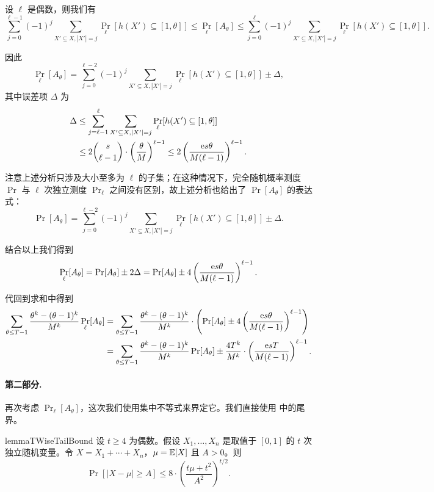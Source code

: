 设 $\ell$ 是偶数，则我们有
$$
\sum_{j = 0}^{\ell - 1} (-1)^j \sum_{X' \subseteq X, |X'| = j} \Pr_\ell[h(X') \subseteq [1, \theta]] \le \Pr_\ell[A_\theta] \le \sum_{j = 0}^\ell (-1)^j \sum_{X' \subseteq X, |X'| = j} \Pr_\ell[h(X') \subseteq [1, \theta]].
$$

因此
$$
\Pr_\ell[A_\theta] = \sum_{j = 0}^{\ell - 2} (-1)^j \sum_{X' \subseteq X, |X'| = j} \Pr_\ell[h(X') \subseteq [1, \theta]] \pm \Delta,
$$
其中误差项 $\Delta$ 为
$$
\begin{aligned}
    \Delta & \le \sum_{j = \ell - 1}^\ell \sum_{X' \subseteq X, |X'| = j} \Pr_\ell[h(X') \subseteq [1, \theta]] \\
     & \le 2 \binom{s}{\ell - 1} \cdot \left( \frac{\theta}{M} \right)^{\ell - 1} \le 2 \left( \frac{\mathrm{e} s \theta}{M (\ell - 1)} \right)^{\ell - 1}.
\end{aligned}
$$

注意上述分析只涉及大小至多为 $\ell$ 的子集；在这种情况下，完全随机概率测度 $\Pr$ 与 $\ell$ 次独立测度 $\Pr_\ell$ 之间没有区别，故上述分析也给出了 $\Pr[A_\theta]$ 的表达式：
$$
\Pr[A_\theta] = \sum_{j = 0}^{\ell - 2} (-1)^j \sum_{X' \subseteq X, |X'| = j} \Pr_\ell[h(X') \subseteq [1, \theta]] \pm \Delta.
$$

结合以上我们得到
$$
\Pr_\ell[A_\theta] = \Pr[A_\theta] \pm 2 \Delta = \Pr[A_\theta] \pm 4 \left( \frac{\mathrm{e} s \theta}{M (\ell - 1)} \right)^{\ell - 1}.
$$

代回到求和中得到
$$
\begin{aligned}
    \sum_{\theta \le T - 1} \frac{\theta^k - (\theta - 1)^k}{M^k} \Pr_\ell[A_\theta] & = \sum_{\theta \le T - 1} \frac{\theta^k - (\theta - 1)^k}{M^k} \cdot \left( \Pr[A_\theta] \pm 4 \left( \frac{\mathrm{e} s \theta}{M (\ell - 1)} \right)^{\ell - 1} \right) \\
     & = \sum_{\theta \le T - 1} \frac{\theta^k - (\theta - 1)^k}{M^k} \Pr[A_\theta] \pm \frac{4 T^k}{M^k} \cdot \left( \frac{\mathrm{e} s T}{M (\ell - 1)} \right)^{\ell - 1}.
\end{aligned}
$$

\paragraph{第二部分.}

再次考虑 $\Pr_\ell[A_\theta]$，这次我们使用集中不等式来界定它。我们直接使用 \cite{Bellare_Rompel_94} 中的尾界。

\begin{restatable}{lemma}{TWiseTailBound}\label{lem:tail_bound_t_wise_BR94}
    设 $t \ge 4$ 为偶数。假设 $X_1, \ldots, X_n$ 是取值于 $[0, 1]$ 的 $t$ 次独立随机变量。令 $X = X_1 + \cdots + X_n$，$\mu = \operatorname*{\mathbb{E}}[X]$ 且 $A > 0$。则
    $$
    \Pr[|X - \mu| \ge A] \le 8 \cdot \left( \frac{t \mu + t^2}{A^2} \right)^{t / 2}.
    $$
\end{restatable}

